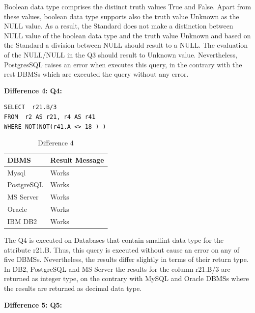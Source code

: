 Boolean data type comprises the distinct truth values True and False. Apart from these values, boolean data type supports also the truth value Unknown as the NULL value. As a result, the Standard does not make a distinction between NULL value of the boolean data type and the truth value Unknown and based on the Standard a division between NULL should result to a NULL. The evaluation of the NULL/NULL in the Q3 should result to Unknown value. Nevertheless, PostgresSQL raises an error when executes this query, in the contrary with the rest DBMSs which are executed the query without any error. 


\hfill\newline\textbf{Difference 4:}
\hfill\newline\textbf{Q4:}

\begin{mdframed}[backgroundcolor=lightgray!20]
\begin{lstlisting}[style=SQL]
SELECT  r21.B/3
FROM  r2 AS r21, r4 AS r41
WHERE NOT(NOT(r41.A <> 18 ) )  
\end{lstlisting}
\end{mdframed}

 
\begin{table}[h]
\centering
\caption{Difference 4}
\label{my-label}
\begin{tabular}{|p{2cm}|p{11.5cm}| }
\hline
\textbf{DBMS} & \textbf{Result Message} \\ \hline
Mysql         & Works                   \\ \hline
PostgreSQL    & Works                   \\ \hline
MS Server     & Works                   \\ \hline
Oracle        & Works                   \\ \hline
IBM DB2       & Works                   \\ \hline
\end{tabular}
\end{table}

The Q4 is executed on Databases that contain smallint data type for the attribute r21.B. Thus, this query is executed without cause an error on any of five DBMSs. Nevertheless, the results differ slightly in terms of their return type. In DB2, PostgreSQL and MS Server the results for the column r21.B/3 are returned as integer type, on the contrary with MySQL and Oracle DBMSs where the results are returned as decimal data type. 

\hfill\newline\textbf{Difference 5:}
\hfill\newline\textbf{Q5:}


